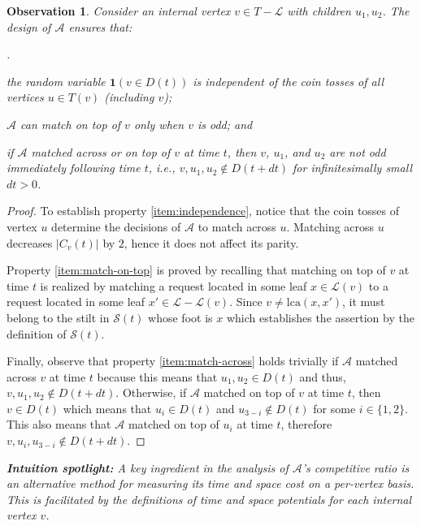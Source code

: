 \documentclass[11pt]{article}
\def\LongVersion{}
\def\LongVersionEnd{}
\theoremstyle{definition}
\theoremstyle{plain}
\newtheorem*{observation*}{Observation}
\theoremstyle{definition}
\theoremstyle{plain}
\theoremstyle{definition}
\theoremstyle{plain}
\newenvironment{DenseEnumerate}[1][\theenumi.]
{\begin{list}{#1}{\usecounter{enumi}
\itemsep 0pt \parsep 0pt \leftmargin 5mm \labelwidth 5mm \parskip 0pt \topsep
0pt}}
{\end{list}}
\newenvironment{IntuitionSpotlight}[0]
{\par%
\setlength{\leftskip}{0.5\parindent}%
\setlength{\rightskip}{0.5\parindent}%
\noindent\itshape\textbf{Intuition spotlight:}}
{\par\ignorespacesafterend}
\newcommand{\Leaves}{\mathcal{L}}
\newcommand{\LCA}{\mathrm{lca}}
\newcommand{\Indicator}{\mathbf{1}}
\newcommand{\Active}{\mathit{C}}
\newcommand{\Odd}{\mathit{D}}
\newcommand{\Stilts}{\mathcal{S}}
\newcommand{\A}{\mathcal{A}}
\begin{document}
\begin{observation*}
Consider an internal vertex $v \in T - \Leaves$ with children $u_{1}, u_{2}$.
The design of $\A$ ensures that:
\begin{DenseEnumerate}

\item \label{item:independence}
the random variable
$\Indicator(v \in \Odd(t))$
is independent of the coin tosses of all vertices $u \in T(v)$ (including
$v$);

\item \label{item:match-on-top}
$\A$ can match on top of $v$ only when $v$ is odd; and

\item \label{item:match-across}
if $\A$ matched across or on top of $v$ at time $t$, then
\LongVersion %
$v$, $u_{1}$, and $u_{2}$ are not odd immediately following time
$t$, i.e.,
\LongVersionEnd %
$v, u_{1}, u_{2} \notin \Odd(t + d t)$
for infinitesimally small
$d t > 0$.

\end{DenseEnumerate}
\end{observation*}
%
\begin{proof}
To establish property \ref{item:independence}, notice that the coin tosses of
vertex $u$ determine the decisions of $\A$ to match across $u$.
Matching across $u$ decreases $|\Active_{v}(t)|$ by $2$, hence it does not
affect its parity.
\LongVersion \par \LongVersionEnd
Property \ref{item:match-on-top} is proved by recalling that matching on top
of $v$ at time $t$ is realized by matching a request located in some leaf
$x \in \Leaves(v)$
to a request located in some leaf
$x' \in \Leaves - \Leaves(v)$.
Since $v \neq \LCA(x, x')$, it must belong to the stilt in $\Stilts(t)$
whose foot is $x$ which establishes the assertion by the definition of
$\Stilts(t)$.
\LongVersion \par \LongVersionEnd
Finally, observe that property \ref{item:match-across} holds trivially if $\A$
matched across $v$ at time $t$ because this means that
$u_{1}, u_{2} \in \Odd(t)$
and thus,
$v, u_{1}, u_{2} \notin \Odd(t + d t)$.
Otherwise, if $\A$ matched on top of $v$ at time $t$, then
$v \in \Odd(t)$
which means that
$u_{i} \in \Odd(t)$
and
$u_{3 - i} \notin \Odd(t)$
for some
$i \in \{ 1, 2 \}$.
This also means that $\A$ matched on top of $u_{i}$ at time $t$, therefore
$v, u_{i}, u_{3 - i} \notin \Odd(t + d t)$.
\end{proof}

\begin{IntuitionSpotlight}
A key ingredient in the analysis of $\A$'s competitive ratio is an alternative
method for measuring its time and space cost on a \emph{per-vertex basis}.
This is facilitated by the definitions of time and space potentials for each
internal vertex $v$.
\end{IntuitionSpotlight}
\end{document}
